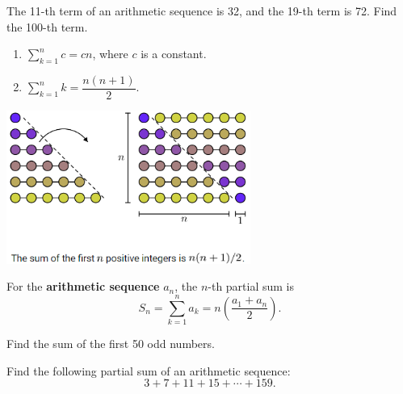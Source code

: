 \begin{example}
The 11-th term of an arithmetic sequence is 32, and the 19-th term is 72. Find the 100-th term.
\end{example}
\vspace*{6\baselineskip}

\noindent
\begin{minipage}{\textwidth}
 \begin{minipage}{0.49\textwidth}
        \begin{theorem}\mbox{}
    \begin{enumerate}[itemsep=0.5\baselineskip,, after=\vspace*{0.5\baselineskip}]
        \item $\sum\limits_{k=1}^n c=cn$, where $c$ is a constant.
        \item $\sum\limits_{k=1}^n k=\dfrac{n(n+1)}{2}$.
    \end{enumerate}
\end{theorem}
    \end{minipage}
    \begin{minipage}{0.49\textwidth}
        \centering
\includegraphics[width=0.6\textwidth, keepaspectratio]{figs/sumofk.png}
    \end{minipage}
\end{minipage}
\vspace*{\baselineskip}

\begin{theorem}
    For the \textbf{arithmetic sequence} $a_n$, the $n$-th partial sum is
    \[S_n=\sum\limits_{k=1}^n a_k=n\left(\dfrac{a_1+a_n}{2}\right).\]
\end{theorem}

\begin{example}
    Find the sum of the first 50 odd numbers.
\end{example}
\vspace*{6\baselineskip}

\begin{example}
    Find the following partial sum of an arithmetic sequence:
    \[3+7+11+15+\cdots+159.\]
\end{example}
\vspace*{6\baselineskip}


